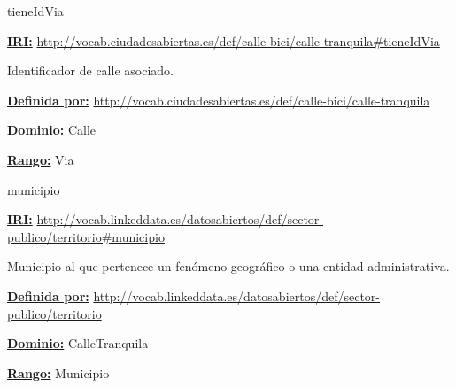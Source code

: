 \begin{mybox}{tieneIdVia}
\begin{flushleft}
\underline{\textbf{IRI:}}
\url{http://vocab.ciudadesabiertas.es/def/calle-bici/calle-tranquila#tieneIdVia}
\newline

Identificador de calle asociado.
\newline

\underline{\textbf{Definida por:}}
\url{http://vocab.ciudadesabiertas.es/def/calle-bici/calle-tranquila}
\newline

\underline{\textbf{Dominio:}}
		Calle
\newline

\underline{\textbf{Rango:}}
		Via
\newline


\end{flushleft}
\end{mybox}



\begin{mybox}{municipio}
\begin{flushleft}
\underline{\textbf{IRI:}}
\url{http://vocab.linkeddata.es/datosabiertos/def/sector-publico/territorio#municipio}
\newline

Municipio al que pertenece un fenómeno geográfico o una entidad administrativa.
\newline

\underline{\textbf{Definida por:}}
\url{http://vocab.linkeddata.es/datosabiertos/def/sector-publico/territorio}
\newline

\underline{\textbf{Dominio:}}
		CalleTranquila
\newline

\underline{\textbf{Rango:}}
		Municipio

\end{flushleft}
\end{mybox}








